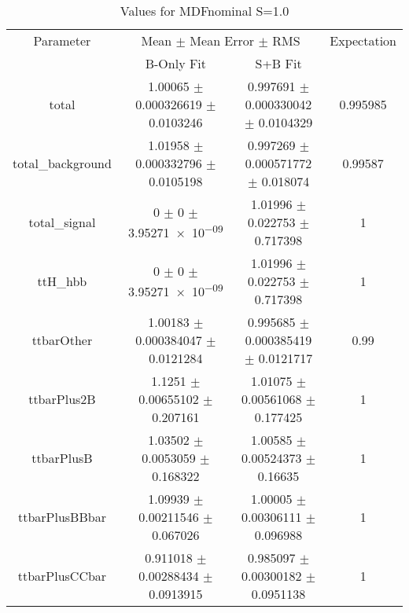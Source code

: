 \begin{table}
\centering
\caption{Values for MDFnominal S=1.0}
\begin{tabular}{cccc}
\toprule
Parameter & \multicolumn{2}{c}{Mean $\pm$ Mean Error $\pm$ RMS} & Expectation\\
 & B-Only Fit & S+B Fit & \\
\midrule
total & \num{1.00065} $\pm$ \num{0.000326619} $\pm$ \num{0.0103246} & \num{0.997691} $\pm$ \num{0.000330042} $\pm$ \num{0.0104329} & \num{0.995985}\\
total\_background & \num{1.01958} $\pm$ \num{0.000332796} $\pm$ \num{0.0105198} & \num{0.997269} $\pm$ \num{0.000571772} $\pm$ \num{0.018074} & \num{0.99587}\\
total\_signal & \num{0} $\pm$ \num{0} $\pm$ \num{3.95271e-09} & \num{1.01996} $\pm$ \num{0.022753} $\pm$ \num{0.717398} & \num{1}\\
ttH\_hbb & \num{0} $\pm$ \num{0} $\pm$ \num{3.95271e-09} & \num{1.01996} $\pm$ \num{0.022753} $\pm$ \num{0.717398} & \num{1}\\
ttbarOther & \num{1.00183} $\pm$ \num{0.000384047} $\pm$ \num{0.0121284} & \num{0.995685} $\pm$ \num{0.000385419} $\pm$ \num{0.0121717} & \num{0.99}\\
ttbarPlus2B & \num{1.1251} $\pm$ \num{0.00655102} $\pm$ \num{0.207161} & \num{1.01075} $\pm$ \num{0.00561068} $\pm$ \num{0.177425} & \num{1}\\
ttbarPlusB & \num{1.03502} $\pm$ \num{0.0053059} $\pm$ \num{0.168322} & \num{1.00585} $\pm$ \num{0.00524373} $\pm$ \num{0.16635} & \num{1}\\
ttbarPlusBBbar & \num{1.09939} $\pm$ \num{0.00211546} $\pm$ \num{0.067026} & \num{1.00005} $\pm$ \num{0.00306111} $\pm$ \num{0.096988} & \num{1}\\
ttbarPlusCCbar & \num{0.911018} $\pm$ \num{0.00288434} $\pm$ \num{0.0913915} & \num{0.985097} $\pm$ \num{0.00300182} $\pm$ \num{0.0951138} & \num{1}\\
\bottomrule
\end{tabular}
\end{table}
